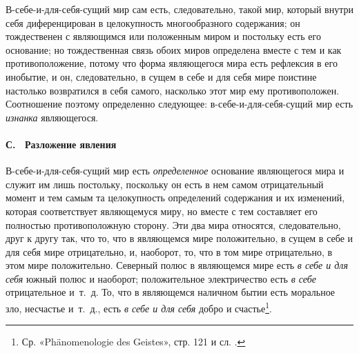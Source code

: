 В-себе-и-для-себя-сущий мир сам есть, следовательно, такой мир, который
внутри себя диференцирован в целокупность многообразного содержания; он
тождественен с являющимся или положенным миром и постольку есть его
основание; но тождественная связь обоих миров определена вместе с тем и как
противоположение, потому что форма являющегося мира есть рефлексия в его
инобытие, и он, следовательно, в сущем в себе и для себя мире поистине
настолько возвратился в себя самого, насколько этот мир ему противоположен.
Соотношение поэтому определенно следующее: в-себе-и-для-себя-сущий мир есть
{\em изнанка} являющегося.

\paragraph[С. \ Разложение явления]{С. \ Разложение явления}
\hypertarget{Toc478978748}{}В-себе-и-для-себя-сущий мир есть
{\em определенное} основание являющегося мира и служит
им лишь постольку, поскольку он есть в нем самом отрицательный момент и тем
самым та целокупность определений содержания и их изменений, которая
соответствует являющемуся миру, но вместе с тем составляет его полностью
противоположную сторону. Эти два мира относятся, следовательно, друг к
другу так, что то, что в являющемся мире положительно, в сущем в себе и для
себя мире отрицательно, и, наоборот, то, что в том мире отрицательно, в
этом мире положительно. Северный полюс в являющемся мире есть
{\em в себе и для себя} южный полюс и наоборот;
положительное электричество есть {\em в себе}
отрицательное и~т.~д. То, что в являющемся наличном бытии есть моральное
зло, несчастье и~т.~д., есть {\em в себе и для себя}
добро и счастье\footnote{ Ср. «Phänomenologie des Geistes», стр. 121 и сл.
\textstyleEndnodeLink{(\ref{bkm:Ref474667017}}\label{bkm:bm86}\textstyleEndnodeLink{)}.}.

